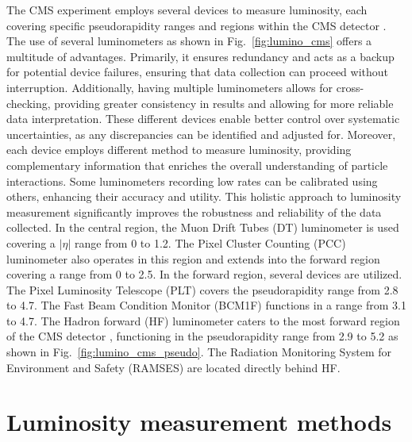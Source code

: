 The CMS experiment employs several devices to measure luminosity, each covering specific pseudorapidity ranges and regions within the CMS detector \cite{pas_18}. The use of several luminometers as shown in Fig.~\ref{fig:lumino_cms} offers a multitude of advantages. Primarily, it ensures redundancy and acts as a backup for potential device failures, ensuring that data collection can proceed without interruption. Additionally, having multiple luminometers allows for cross-checking, providing greater consistency in results and allowing for more reliable data interpretation. These different devices enable better control over systematic uncertainties, as any discrepancies can be identified and adjusted for. Moreover, each device employs different method to measure luminosity, providing complementary information that enriches the overall understanding of particle interactions. Some luminometers recording low rates can be calibrated using others, enhancing their accuracy and utility. This holistic approach to luminosity measurement significantly improves the robustness and reliability of the data collected. In the central region, the Muon Drift Tubes (DT) luminometer is used covering a $|\eta|$ range from 0 to 1.2. The Pixel Cluster Counting (PCC) luminometer also operates in this region and extends into the forward region covering a range from 0 to 2.5. In the forward region, several devices are utilized. The Pixel Luminosity Telescope (PLT) covers the pseudorapidity range from 2.8 to 4.7. The Fast Beam Condition Monitor (BCM1F) functions in a range from 3.1 to 4.7. The Hadron forward (HF) luminometer caters to the most forward region of the CMS detector \cite{Sirunyan:2759951}, functioning in the pseudorapidity range from 2.9 to 5.2 as shown in Fig.~\ref{fig:lumino_cms_pseudo}. The Radiation Monitoring System for Environment and Safety (RAMSES) are located directly behind HF.


\section{Luminosity measurement methods}


